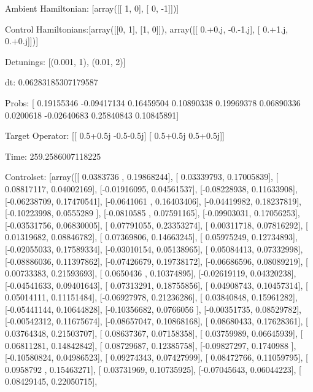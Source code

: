 \documentclass{article}
\begin{document}
    

\newpage

Ambient Hamiltonian: [array([[ 1,  0],
       [ 0, -1]])]

Control Hamiltonians:[array([[0, 1],
       [1, 0]]), array([[ 0.+0.j, -0.-1.j],
       [ 0.+1.j,  0.+0.j]])]

Detunings: [(0.001, 1), (0.01, 2)]

 dt: 0.06283185307179587

Probs: [ 0.19155346 -0.09417134  0.16459504  0.10890338  0.19969378  0.06890336
  0.0200618  -0.02640683  0.25840843  0.10845891]

Target Operator: [[ 0.5+0.5j -0.5-0.5j]
 [ 0.5+0.5j  0.5+0.5j]]

Time: 259.2586007118225

Controlset: [array([[ 0.0383736 ,  0.19868244],
       [ 0.03339793,  0.17005839],
       [ 0.08817117,  0.04002169],
       [-0.01916095,  0.04561537],
       [-0.08228938,  0.11633908],
       [-0.06238709,  0.17470541],
       [-0.0641061 ,  0.16403406],
       [-0.04419982,  0.18237819],
       [-0.10223998,  0.0555289 ],
       [-0.0810585 ,  0.07591165],
       [-0.09903031,  0.17056253],
       [-0.03531756,  0.06830005],
       [ 0.07791055,  0.23353274],
       [ 0.00311718,  0.07816292],
       [ 0.01319682,  0.08846782],
       [ 0.07369806,  0.14663245],
       [ 0.05975249,  0.12734893],
       [-0.02055033,  0.17589334],
       [-0.03010154,  0.05138965],
       [ 0.05084413,  0.07332998],
       [-0.08886036,  0.11397862],
       [-0.07426679,  0.19738172],
       [-0.06686596,  0.08089219],
       [ 0.00733383,  0.21593693],
       [ 0.0650436 ,  0.10374895],
       [-0.02619119,  0.04320238],
       [-0.04541633,  0.09401643],
       [ 0.07313291,  0.18755856],
       [ 0.04908743,  0.10457314],
       [ 0.05014111,  0.11151484],
       [-0.06927978,  0.21236286],
       [ 0.03840848,  0.15961282],
       [-0.05441144,  0.10644828],
       [-0.10356682,  0.0766056 ],
       [-0.00351735,  0.08529782],
       [-0.00542312,  0.11675674],
       [-0.08657047,  0.10868168],
       [ 0.08680433,  0.17628361],
       [ 0.03764348,  0.21503707],
       [ 0.08637367,  0.07158358],
       [ 0.03759989,  0.06645939],
       [ 0.06811281,  0.14842842],
       [ 0.08729687,  0.12385758],
       [-0.09827297,  0.1740988 ],
       [-0.10580824,  0.04986523],
       [ 0.09274343,  0.07427999],
       [ 0.08472766,  0.11059795],
       [ 0.0958792 ,  0.15463271],
       [ 0.03731969,  0.10735925],
       [-0.07045643,  0.06044223],
       [ 0.08429145,  0.22050715],
\end{document}
